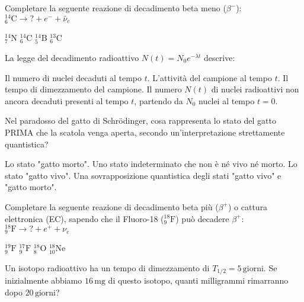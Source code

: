 \documentclass{exam}%
\begin{document}
\begin{questions}%
\question Completare la seguente reazione di decadimento beta meno ($\beta^-$): $^{14}_{6}\text{C} \rightarrow ? + e^- + \bar{\nu}_e$%
\vspace{0.2em}%
\begin{multicols}{4}%
\begin{choices}%
\choice $^{14}_{7}\text{N}$%
\choice $^{14}_{6}\text{C}$%
\choice $^{14}_{5}\text{B}$%
\choice $^{13}_{6}\text{C}$%
\end{choices}%
\end{multicols}%
\question La legge del decadimento radioattivo $N(t) = N_0 e^{-\lambda t}$ descrive:%
\vspace{0.2em}%
\begin{choices}%
\choice Il numero di nuclei decaduti al tempo $t$.%
\choice L'attività del campione al tempo $t$.%
\choice Il tempo di dimezzamento del campione.%
\choice Il numero $N(t)$ di nuclei radioattivi non ancora decaduti presenti al tempo $t$, partendo da $N_0$ nuclei al tempo $t=0$.%
\end{choices}%
\question Nel paradosso del gatto di Schrödinger, cosa rappresenta lo stato del gatto PRIMA che la scatola venga aperta, secondo un'interpretazione strettamente quantistica?%
\vspace{0.2em}%
\begin{choices}%
\choice Lo stato "gatto morto".%
\choice Uno stato indeterminato che non è né vivo né morto.%
\choice Lo stato "gatto vivo".%
\choice Una sovrapposizione quantistica degli stati "gatto vivo" e "gatto morto".%
\end{choices}%
\question Completare la seguente reazione di decadimento beta più ($\beta^+$) o cattura elettronica (EC), sapendo che il Fluoro-18 ($^{18}_{9}\text{F}$) può decadere $\beta^+$: $^{18}_{9}\text{F} \rightarrow ? + e^+ + \nu_e$%
\vspace{0.2em}%
\begin{multicols}{4}%
\begin{choices}%
\choice $^{19}_{9}\text{F}$%
\choice $^{17}_{9}\text{F}$%
\choice $^{18}_{8}\text{O}$%
\choice $^{18}_{10}\text{Ne}$%
\end{choices}%
\end{multicols}%
\question Un isotopo radioattivo ha un tempo di dimezzamento di $T_{1/2} = 5 \, \text{giorni}$. Se inizialmente abbiamo $16 \, \text{mg}$ di questo isotopo, quanti milligrammi rimarranno dopo $20 \, \text{giorni}$?%
\vspace{0.2em}%
\begin{multicols}{4}%

\end{multicols}
\end{questions}
\end{document}

